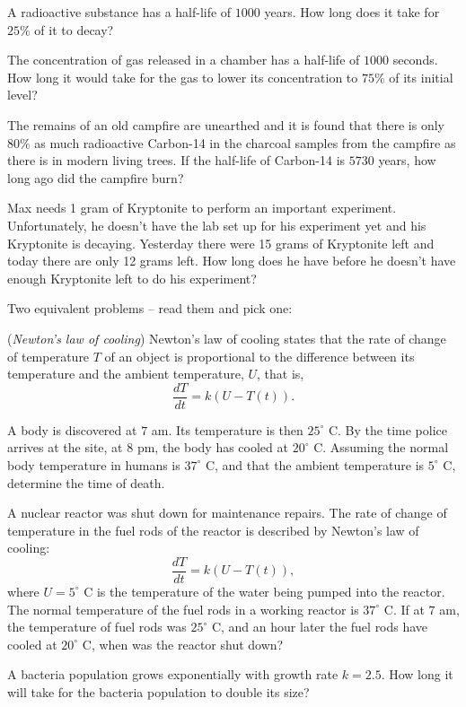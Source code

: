 \begin{multicols}{2}
\subprob A radioactive substance has a half-life of $1000$ years.  How long does
it take for $25\%$ of it to decay?

\subprob The concentration of gas released in a chamber has a half-life of
$1000$ seconds. How long it would take for the gas to lower its concentration to
$75\%$ of its initial level?

\problem The remains of an old campfire are unearthed and it is found that there
is only $80\%$ as much radioactive Carbon-14 in the charcoal samples from the
campfire as there is in modern living trees.  If the half-life of Carbon-14 is
$5730$ years, how long ago did the campfire burn?

\problem Max needs 1 gram of Kryptonite to perform an important experiment.
Unfortunately, he doesn't have the lab set up for his experiment yet and his
Kryptonite is decaying.  Yesterday there were 15 grams of Kryptonite left and
today there are only 12 grams left.  How long does he have before he doesn't
have enough Kryptonite left to do his experiment?

\problem Two equivalent problems -- read them and pick one:

\subprob ({\it Newton's law of cooling})
Newton's law of cooling states that the rate of change of temperature $T$
of an object is proportional to the difference between its temperature
and the ambient temperature, $U$, that is,
\[
  \frac{dT}{dt}=k\left(U-T(t)\right).
\]

A body is discovered at $7$ am. Its temperature is then $25^{\circ}$ C. By the
time police arrives at the site, at $8$ pm, the body has cooled at $20^{\circ}$
C. Assuming the normal body temperature in humans is $37^{\circ}$ C, and that
the ambient temperature is $5^{\circ}$ C, determine the time of death.

\subprob A nuclear reactor was shut down for maintenance repairs. The rate of
change of temperature in the fuel rods of the reactor is described by Newton's
law of cooling:
\[
  \frac{dT}{dt}=k\left(U-T(t)\right),
\]
where $U=5^{\circ}$ C is the temperature of the water being pumped into the
reactor. The normal temperature of the fuel rods in a working reactor is
$37^{\circ}$ C.  If at $7$ am, the temperature of fuel rods was $25^{\circ}$ C,
and an hour later the fuel rods have cooled at $20^{\circ}$ C, when was the
reactor shut down?

\problem A bacteria population grows exponentially with growth rate $k=2.5$. How
long it will take for the bacteria population to double its size?


\end{multicols}
